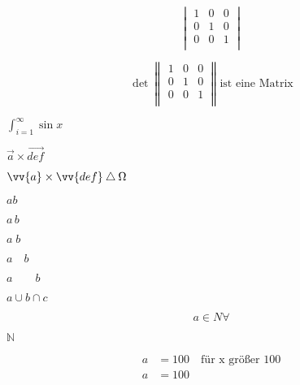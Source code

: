 \documentclass[12pt,ngerman,parskip=half]{scrartcl}
\begin{document}
\[%
\begin{vmatrix} 
1 & 0 & 0 \\ 
0 & 1 & 0 \\ 
0 & 0 & 1 \\ 
\end{vmatrix}
\]

\[%
\det 
\begin{Vmatrix} 
1 & 0 & 0 \\ 
0 & 1 & 0 \\ 
0 & 0 & 1 \\ 
\end{Vmatrix}
\text{ist eine Matrix}
\]

\( \int_{i=1}^{\infty} \sin x \)

\( \vec{a} \times \vec{def} \)

\( \vv{a} \times \vv{def} \bigtriangleup \Omega  \)



\( ab \) %

\(a\,b \)

\(a\;b\)

\(a\quad b\)

\(a\qquad b\)

\(a \cup b \cap c\)

\[ a \in N \forall  \]

\(  \mathbb{N} \)


\begin{align}
a &= 100 \quad \text{für x größer 100} \\
a &= 100 
\end{align}
\end{document}
